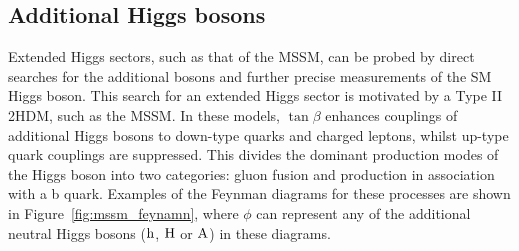 \subsection{Additional Higgs bosons} 
\label{sec:additional_higgs_bosons} 
 
Extended Higgs sectors, such as that of the \ac{MSSM}, can be probed by direct searches for the additional bosons and further precise measurements of the \ac{SM} Higgs boson. 
This search for an extended Higgs sector is motivated by a Type II \ac{2HDM}, such as the \ac{MSSM}.
In these models, $\tan\beta$ enhances couplings of additional Higgs bosons to down-type quarks and charged leptons, whilst up-type quark couplings are suppressed.
This divides the dominant production modes of the Higgs boson into two categories: gluon fusion and production in association with a b quark.
Examples of the Feynman diagrams for these processes are shown in Figure~\ref{fig:mssm_feynamn}, where $\phi$ can represent any of the additional neutral Higgs bosons (${\text{h}}$, ${\text{H}}$ or ${\text{A}}$) in these diagrams.\\

